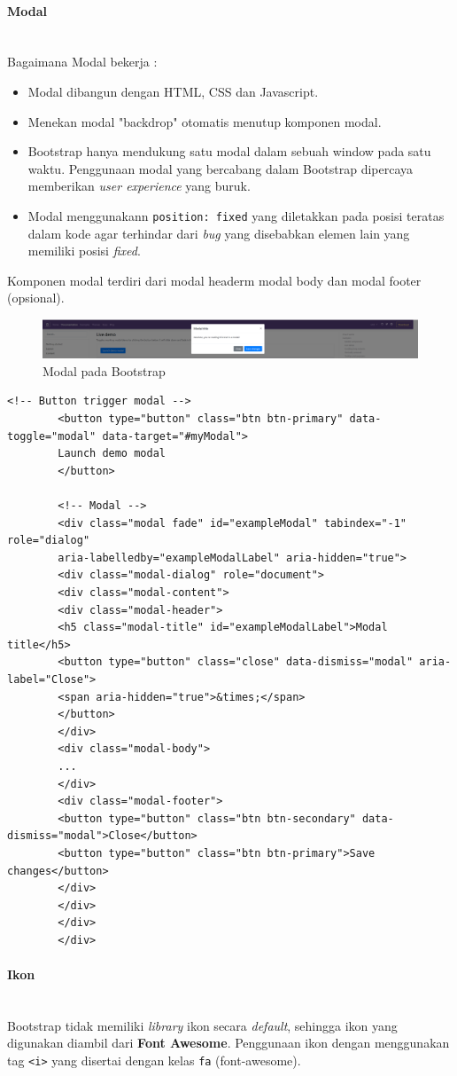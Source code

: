 \documentclass[a4paper,twoside]{article}
\newcommand{\myparagraph}[1]{\paragraph{#1}\mbox{}\\}
\begin{document}
\begin{enumerate}
		\myparagraph{Modal}
		Bagaimana Modal bekerja :
		\begin{itemize}
			\item Modal dibangun dengan HTML, CSS dan Javascript. 
			\item Menekan modal "backdrop" otomatis menutup komponen modal.
			\item Bootstrap hanya mendukung satu modal dalam sebuah window pada satu waktu. Penggunaan modal yang bercabang dalam Bootstrap dipercaya memberikan \textit{user experience} yang buruk.
			\item Modal menggunakann \texttt{position: fixed} yang diletakkan pada posisi teratas dalam kode agar terhindar dari \textit{bug} yang disebabkan elemen lain yang memiliki posisi \textit{fixed}. 
		\end{itemize}
		Komponen modal terdiri dari modal headerm modal body dan modal footer (opsional).
		\begin{figure} [H]
			\centering  
			\includegraphics[scale=0.5]{livemodal_bootstrap.png}  
			\caption{Modal pada Bootstrap} 
		\end{figure}
		\begin{lstlisting}[frame=single, basicstyle=\tiny] 
		<!-- Button trigger modal -->
		<button type="button" class="btn btn-primary" data-toggle="modal" data-target="#myModal">
		Launch demo modal
		</button>
		
		<!-- Modal -->
		<div class="modal fade" id="exampleModal" tabindex="-1" role="dialog" 
		aria-labelledby="exampleModalLabel" aria-hidden="true">
		<div class="modal-dialog" role="document">
		<div class="modal-content">
		<div class="modal-header">
		<h5 class="modal-title" id="exampleModalLabel">Modal title</h5>
		<button type="button" class="close" data-dismiss="modal" aria-label="Close">
		<span aria-hidden="true">&times;</span>
		</button>
		</div>
		<div class="modal-body">
		...
		</div>
		<div class="modal-footer">
		<button type="button" class="btn btn-secondary" data-dismiss="modal">Close</button>
		<button type="button" class="btn btn-primary">Save changes</button>
		</div>
		</div>
		</div>
		</div>
		\end{lstlisting}
		
		\myparagraph{Ikon}
		Bootstrap tidak memiliki \textit{library} ikon secara \textit{default}, sehingga ikon yang digunakan diambil dari \textbf{Font Awesome}. Penggunaan ikon dengan menggunakan tag \colorbox{mygray}{\texttt{<i>}} yang disertai dengan kelas \colorbox{mygray}{\texttt{fa}} (font-awesome). 
		

\end{enumerate}
\end{document}
